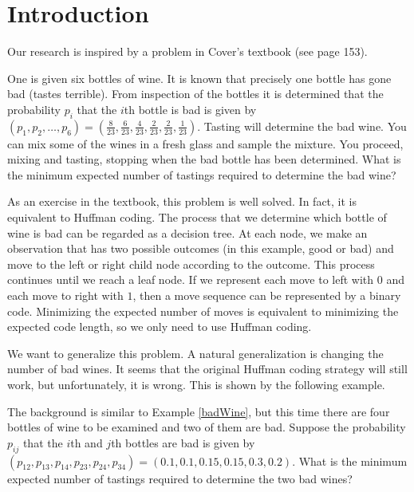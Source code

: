 \setcounter{page}{1} %

\section{Introduction} %

Our research is inspired by a problem in Cover's textbook\cite{cover1999elements} (see page 153).

\begin{example}
\label{badWine}
One is given six bottles of wine. It is known that precisely one bottle has gone bad (tastes terrible). From inspection of the bottles it is determined that the probability $p_i$ that the $i$th bottle is bad is given by $(p_1, p_2, \dots, p_6) = (\frac{8}{23},\frac{6}{23},\frac{4}{23},\frac{2}{23},\frac{2}{23}, \frac{1}{23})$. Tasting will determine the bad wine. You can mix some of the wines in a fresh glass and sample the mixture. You proceed, mixing and tasting, stopping when the bad bottle has been determined. What is the minimum expected number of tastings required to determine the bad wine?
\end{example}

As an exercise in the textbook, this problem is well solved. In fact, it is equivalent to Huffman coding. The process that we determine which bottle of wine is bad can be regarded as a decision tree. At each node, we make an observation that has two possible outcomes (in this example, good or bad) and move to the left or right child node according to the outcome. This process continues until we reach a leaf node. If we represent each move to left with $0$ and each move to right with $1$, then a move sequence can be represented by a binary code. Minimizing the expected number of moves is equivalent to minimizing the expected code length, so we only need to use Huffman coding.

We want to generalize this problem. A natural generalization is changing the number of bad wines. It seems that the original Huffman coding strategy will still work, but unfortunately, it is wrong. This is shown by the following example.

\begin{example}
\label{moreBadWine}
The background is similar to Example \ref{badWine}, but this time there are four bottles of wine to be examined and two of them are bad. Suppose the probability $p_{ij}$ that the $i$th and $j$th bottles are bad is given by $(p_{12},p_{13},p_{14},p_{23},p_{24},p_{34})=(0.1,0.1,0.15,0.15,0.3,0.2)$. What is the minimum expected number of tastings required to determine the two bad wines?
\end{example}

